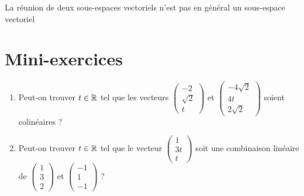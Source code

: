\begin{frame} 


La réunion de deux sous-espaces vectoriels n'est pas en général 
un sous-espace vectoriel

\pause

\begin{itemize}
\end{itemize}

\end{frame}

\section{Mini-exercices}

\begin{frame}

\begin{miniexercice}
\begin{enumerate}
  \item Peut-on trouver $t\in \mathbb{R}$ tel que les vecteurs 
  $\left(\begin{smallmatrix}-2 \\ \sqrt2 \\ t \end{smallmatrix}\right)$ et
  $\left(\begin{smallmatrix}-4\sqrt2 \\ 4t \\ 2\sqrt2 \end{smallmatrix}\right)$ soient colinéaires ?
  
  \vspace*{-1ex}  
  \item Peut-on trouver $t\in \mathbb{R}$ tel que le vecteur  
  $\left(\begin{smallmatrix}1 \\ 3t \\ t \end{smallmatrix}\right)$ soit une combinaison linéaire
  de $\left(\begin{smallmatrix} 1 \\ 3 \\ 2 \end{smallmatrix}\right)$ et 
  $\left(\begin{smallmatrix} -1 \\ 1 \\ -1 \end{smallmatrix}\right)$ ?
    
\end{enumerate}
\end{miniexercice}

\end{frame}

